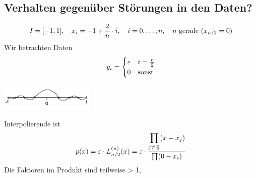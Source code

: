 \documentclass[../Skript.tex]{subfiles}
\begin{document}
\subsection*{Verhalten gegenüber Störungen in den Daten?}
\begin{example}
    \[I=[-1,1], \hspace{1em} x_i=-1+\frac{2}{n}\cdot i, \hspace{1em} i=0,\dots,n,\hspace{1em} n\text{ gerade }(x_{n/2} = 0)\]
    Wir betrachten Daten\[
    y_i = \begin{cases}
        \varepsilon & i=\frac{n}{2}\\
        0 & \text{sonst}
    \end{cases}
    \] \begin{center}
        \includegraphics[width=45mm]{../Bilder/x_2_1.png}\\
    \end{center}
    Interpolierende ist \[
    p(x) = \varepsilon\cdot L_{n/2}^{(n)}(x) = \varepsilon\cdot \displaystyle\frac{\displaystyle\prod_{j\neq \frac{n}{2}}(x-x_j)}{\prod(0-x_i)}
    \]
    Die Faktoren im Produkt sind teilweise > 1,
\end{example}
\end{document}
